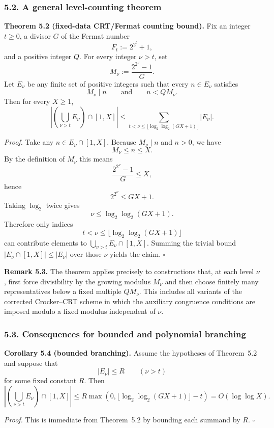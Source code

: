 \subsubsection*{5.2. A general level-counting theorem}

\noindent\textbf{Theorem 5.2 (fixed-data CRT/Fermat counting bound).}
Fix an integer $t\ge 0$, a divisor $G$ of the Fermat number
\[
F_t:=2^{2^t}+1,
\]
and a positive integer $Q$.
For every integer $\nu>t$, set
\[
M_\nu:=\frac{2^{2^\nu}-1}{G}.
\]
Let $E_\nu$ be any finite set of positive integers such that every $n\in E_\nu$ satisfies
\[
M_\nu\mid n
\qquad\text{and}\qquad
n<QM_\nu.
\]
Then for every $X\ge 1$,
\[
\left|\left(\bigcup_{\nu>t}E_\nu\right)\cap [1,X]\right|
\le
\sum_{t<\nu\le \lfloor \log_2\log_2(GX+1)\rfloor} |E_\nu|.
\]

\medskip
\noindent\emph{Proof.}
Take any $n\in E_\nu\cap [1,X]$.
Because $M_\nu\mid n$ and $n>0$, we have
\[
M_\nu\le n\le X.
\]
By the definition of $M_\nu$ this means
\[
\frac{2^{2^\nu}-1}{G}\le X,
\]
hence
\[
2^{2^\nu}\le GX+1.
\]
Taking $\log_2$ twice gives
\[
\nu\le \log_2\log_2(GX+1).
\]
Therefore only indices
\[
t<\nu\le \lfloor \log_2\log_2(GX+1)\rfloor
\]
can contribute elements to $\bigcup_{\nu>t}E_\nu\cap[1,X]$.
Summing the trivial bound $|E_\nu\cap [1,X]|\le |E_\nu|$ over those $\nu$ yields the claim. \hfill$\square$

\medskip
\noindent\textbf{Remark 5.3.}
The theorem applies precisely to constructions that, at each level $\nu$, first force divisibility by the growing modulus $M_\nu$ and then choose finitely many representatives below a fixed multiple $QM_\nu$.
This includes all variants of the corrected Crocker--CRT scheme in which the auxiliary congruence conditions are imposed modulo a fixed modulus independent of $\nu$.

\subsubsection*{5.3. Consequences for bounded and polynomial branching}

\noindent\textbf{Corollary 5.4 (bounded branching).}
Assume the hypotheses of Theorem~5.2 and suppose that
\[
|E_\nu|\le R\qquad (\nu>t)
\]
for some fixed constant $R$.
Then
\[
\left|\left(\bigcup_{\nu>t}E_\nu\right)\cap [1,X]\right|
\le
R\max\!\left(0,\lfloor \log_2\log_2(GX+1)\rfloor-t\right)
=
O(\log\log X).
\]

\medskip
\noindent\emph{Proof.}
This is immediate from Theorem~5.2 by bounding each summand by $R$. \hfill$\square$

